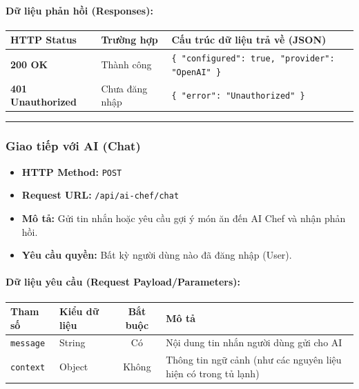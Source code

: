 \documentclass[12pt,a4paper]{article}
\begin{document}
\paragraph{Dữ liệu phản hồi (Responses):}
\begin{longtable}{|p{2.8cm}|p{3.2cm}|p{8.0cm}|}
\hline
\textbf{HTTP Status} & \textbf{Trường hợp} & \textbf{Cấu trúc dữ liệu trả về (JSON)} \\ \hline
\endhead
\textbf{200 OK} & Thành công & \texttt{\{ "configured": true, "provider": "OpenAI" \}} \\ \hline
\textbf{401 Unauthorized} & Chưa đăng nhập & \texttt{\{ "error": "Unauthorized" \}} \\ \hline
\end{longtable}

\vskip 0.4cm
\noindent\rule{\textwidth}{0.3pt}
\vskip 0.4cm

\subsubsection{Giao tiếp với AI (Chat)}
\begin{itemize}[leftmargin=*]
    \item \textbf{HTTP Method:} \texttt{POST}
    \item \textbf{Request URL:} \texttt{/api/ai-chef/chat}
    \item \textbf{Mô tả:} Gửi tin nhắn hoặc yêu cầu gợi ý món ăn đến AI Chef và nhận phản hồi.
    \item \textbf{Yêu cầu quyền:} Bất kỳ người dùng nào đã đăng nhập (User).
\end{itemize}

\paragraph{Dữ liệu yêu cầu (Request Payload/Parameters):}
\begin{longtable}{|p{2.8cm}|p{2.2cm}|c|p{7.0cm}|}
\hline
\textbf{Tham số} & \textbf{Kiểu dữ liệu} & \textbf{Bắt buộc} & \textbf{Mô tả} \\ \hline
\endhead
\texttt{message} & String & Có & Nội dung tin nhắn người dùng gửi cho AI \\ \hline
\texttt{context} & Object & Không & Thông tin ngữ cảnh (như các nguyên liệu hiện có trong tủ lạnh) \\ \hline
\end{longtable}
\end{document}
